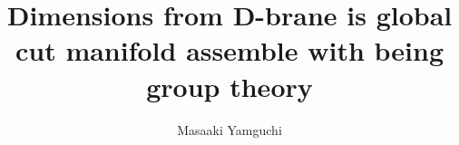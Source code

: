\documentclass{jsarticle}
\begin{document}
\title{Dimensions from D-brane is global \\
cut manifold assemble with being group theory}
\author{Masaaki Yamguchi}
\date{}
\maketitle
   \newcommand{\variint}{%
	\begin{picture}(15,30)
		\put(0,0){
			$ \iint $}
		\put(0,5){\line(15,0){15}}
	\end{picture} %
}

\newcommand{\variiint}{%
	\begin{picture}(15,15)
		\put(0,0){
			$ \iiint $}
		\put(0,5){\line(15,0){20}}
	\end{picture} %
}



 \newcommand{\alearletter}{%
	 \begin{picture}(10,20)
		 \put(0,0){
			 $ \square $}
		 \put(0,0){\line(1,1){10}}
	 \end{picture} %
	 }

 \newcommand{\secproduct}{%
	 \begin{picture}(10,20)
		 \put(0,0){
			 $ \nabla $}
		 \put(5,0){+}
	 \end{picture} %
	 }
 \newcommand{\talot}{%
	 \begin{picture}(15,20)
		 \put(0,0){
			 $ \text{\scalebox{2.0}[2]{$\nabla$}}$}
		 \put(5,3){
			 $ \Delta $}
	 \end{picture} %
	 }
 \newcommand{\hazerdnabla}{%
	 \begin{picture}(15,20)
		 \put(0,0){
			 $ \text{\scalebox{2.0}[2]{$\nabla$}}$}
		 \put(5,3){
			 $\text{Y}  $}
	 \end{picture} %
	 }

 \newcommand{\securebox}{%
	 \begin{picture}(15,20)
		 \put(0,0){
			 $ \text{\scalebox{2.0}[2]{$\square$}}$}
		 \put(5,3){
			 $\text{Y}  $}
	 \end{picture} %
	 }


\newcommand{\timebow}{%
	\begin{picture}(5,5)
		\put(0,0){$\text{\rotatebox{90}{$\bowtie$}}$}
	\end{picture} %
	}


 \newcommand{\flowerletter}{%
	 \begin{picture}(10,20)
		 \put(0,0){$\text{\scalebox{1.0}[1]{$\square$}}$}
		 \put(0,0){$\text{\scalebox{1.0}[2]{$\int$}}$}
	 \end{picture} %
	 }
\newcommand{\squareiint}{%
	\begin{picture}(10,20)
		\put(0,0){
			$ \iint $}
		\put(0,4){$\text{\scalebox{3.0}[0.5]{$\square$}}$}
	\end{picture} %
}
\end{document}
